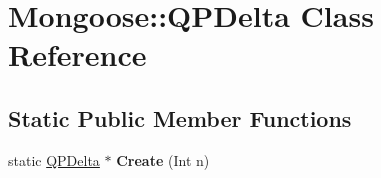 \hypertarget{class_mongoose_1_1_q_p_delta}{}\section{Mongoose\+:\+:Q\+P\+Delta Class Reference}
\label{class_mongoose_1_1_q_p_delta}
\subsection*{Static Public Member Functions}
\begin{DoxyCompactItemize}
\item 
\hypertarget{class_mongoose_1_1_q_p_delta_a04487762032904525aa0811cf015d404}{}\label{class_mongoose_1_1_q_p_delta_a04487762032904525aa0811cf015d404} 
static \hyperlink{class_mongoose_1_1_q_p_delta}{Q\+P\+Delta} $\ast$ {\bfseries Create} (Int n)
\end{DoxyCompactItemize}
